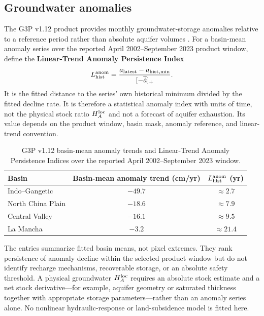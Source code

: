 \documentclass[11pt]{article}
\begin{document}
\subsection{Groundwater anomalies}

The G3P v1.12 product provides monthly groundwater-storage anomalies relative to a reference period rather than absolute aquifer volumes \cite{guentner2024}. For a basin-mean anomaly series over the reported April 2002--September 2023 product window, define the \textbf{Linear-Trend Anomaly Persistence Index}
\begin{equation}
L_{\rm hist}^{\rm anom}
=\frac{a_{\rm latest}-a_{\rm hist,min}}{[-\widehat{\dot a}]_+}.
\label{eq:anomaly-persistence}
\end{equation}
It is the fitted distance to the series' own historical minimum divided by the fitted decline rate. It is therefore a statistical anomaly index with units of time, not the physical stock ratio $H_A^{\rm loc}$ and not a forecast of aquifer exhaustion. Its value depends on the product window, basin mask, anomaly reference, and linear-trend convention.

\begin{table}[h]
\centering
\caption{G3P v1.12 basin-mean anomaly trends and Linear-Trend Anomaly Persistence Indices over the reported April 2002--September 2023 window.}
\begin{tabular}{lcc}
\toprule
Basin & Basin-mean anomaly trend (cm/yr) & $L_{\rm hist}^{\rm anom}$ (yr)\\
\midrule
Indo--Gangetic & $-49.7$ & $\approx2.7$\\
North China Plain & $-18.6$ & $\approx7.9$\\
Central Valley & $-16.1$ & $\approx9.5$\\
La Mancha & $-3.2$ & $\approx21.4$\\
\bottomrule
\end{tabular}
\end{table}

The entries summarize fitted basin means, not pixel extremes. They rank persistence of anomaly decline within the selected product window but do not identify recharge mechanisms, recoverable storage, or an absolute safety threshold. A physical groundwater $H_A^{\rm loc}$ requires an absolute stock estimate and a net stock derivative---for example, aquifer geometry or saturated thickness together with appropriate storage parameters---rather than an anomaly series alone. No nonlinear hydraulic-response or land-subsidence model is fitted here.
\end{document}
